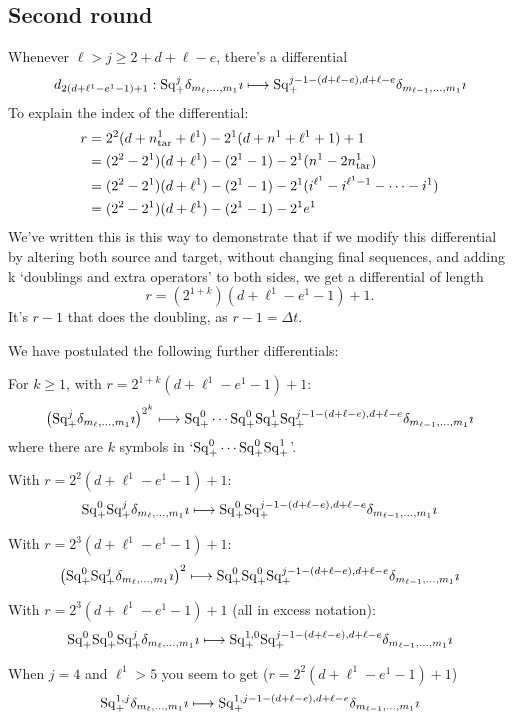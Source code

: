 \documentclass[10pt]{article}
\newcommand{\SqShift}{\Sq_{\smash{+}}}
\newcommand{\Sq}{\mathrm{Sq}}
\begin{document}
\begin{conjectured differentials}
\subsection{Second round}
Whenever $\ell>j\geq2+d+\ell-e$, there's a differential
\[d_{2(d+\ell^1-e^1-1)+1}:\SqShift^j\delta_{m_\ell,\ldots,m_1}\imath\mapsto\SqShift^{j-1-(d+\ell-e),d+\ell-e}\delta_{m_{\ell-1},\ldots,m_1}\imath\]
To explain the index of the differential:
\begin{alignat*}{2}
r
&=
2^2(d+n_\textup{tar}^1+\ell^1)-2^1(d+n^1+\ell^1+1)+1%
\\
&=
(2^2-2^1)(d+\ell^1)-(2^1-1)-2^1(n^1-2n^1_\textup{tar})%
\\
&=
(2^2-2^1)(d+\ell^1)-(2^1-1)-2^1(i^{\ell^1}-i^{\ell^1-1}-\cdots -i^{1})%
\\
&=
(2^2-2^1)(d+\ell^1)-(2^1-1)-2^1e^1%
\end{alignat*}
We've written this is this way to demonstrate that if we modify this differential by altering both source and target, without changing final sequences, and adding k `doublings and extra operators' to both sides, we get a differential of length
\[r=(2^{1+k})(d+\ell^1-e^1-1)+1.\]
It's $r-1$ that does the doubling, as $r-1=\Delta t$.

We have postulated the following further differentials:
\begin{itemise}
\setlength{\parindent}{.25in}
\item For $k\geq1$, with $r=2^{1+k}(d+\ell^1-e^1-1)+1$:
\[\left(\SqShift^j\delta_{m_\ell,\ldots,m_1}\imath\right)^{2^k}\mapsto\SqShift^0\cdots \SqShift^0\SqShift^1\SqShift^{j-1-(d+\ell-e),d+\ell-e}\delta_{m_{\ell-1},\ldots,m_1}\imath\]
where there are $k$ symbols in `$\SqShift^0\cdots \SqShift^0\SqShift^1$'.
\item With $r=2^{2}(d+\ell^1-e^1-1)+1$:
\[\SqShift^0\SqShift^j\delta_{m_\ell,\ldots,m_1}\imath\mapsto\SqShift^0\SqShift^{j-1-(d+\ell-e),d+\ell-e}\delta_{m_{\ell-1},\ldots,m_1}\imath\]
\item With $r=2^{3}(d+\ell^1-e^1-1)+1$:
\[\left(\SqShift^0\SqShift^j\delta_{m_\ell,\ldots,m_1}\imath\right)^2\mapsto\SqShift^0\SqShift^0\SqShift^{j-1-(d+\ell-e),d+\ell-e}\delta_{m_{\ell-1},\ldots,m_1}\imath\]
\item With $r=2^{3}(d+\ell^1-e^1-1)+1$ (all in excess notation):
\[\SqShift^0\SqShift^0\SqShift^j\delta_{m_\ell,\ldots,m_1}\imath\mapsto\SqShift^{1,0}\SqShift^{j-1-(d+\ell-e),d+\ell-e}\delta_{m_{\ell-1},\ldots,m_1}\imath\]
\item When $j=4$ and $\ell^1>5$ you seem to get ($r=2^{2}(d+\ell^1-e^1-1)+1$)
\[\SqShift^{1,j}\delta_{m_\ell,\ldots,m_1}\imath\mapsto\SqShift^{1,j-1-(d+\ell-e),d+\ell-e}\delta_{m_{\ell-1},\ldots,m_1}\imath\]
\end{itemise}



\end{conjectured differentials}
\end{document}
